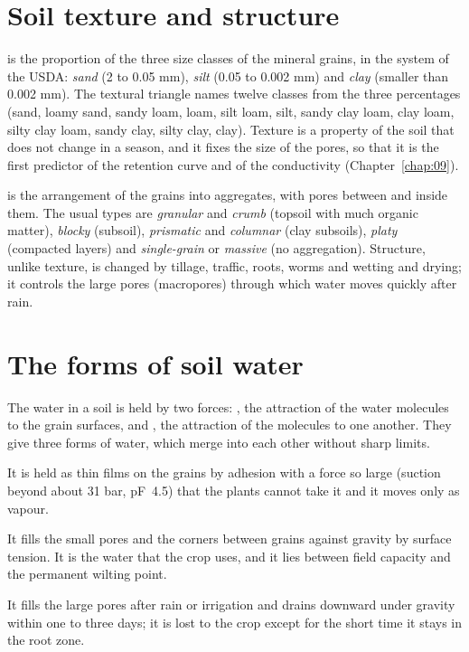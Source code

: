 \section{Soil texture and structure}
 is the proportion of the three size classes of the mineral grains, in the system of the USDA: \emph{sand} (2 to 0.05 mm), \emph{silt} (0.05 to 0.002 mm) and \emph{clay} (smaller than 0.002 mm). The textural triangle names twelve classes from the three percentages (sand, loamy sand, sandy loam, loam, silt loam, silt, sandy clay loam, clay loam, silty clay loam, sandy clay, silty clay, clay). Texture is a property of the soil that does not change in a season, and it fixes the size of the pores, so that it is the first predictor of the retention curve and of the conductivity (Chapter~\ref{chap:09}).

\par\noindent {} is the arrangement of the grains into aggregates, with pores between and inside them. The usual types are \emph{granular} and \emph{crumb} (topsoil with much organic matter), \emph{blocky} (subsoil), \emph{prismatic} and \emph{columnar} (clay subsoils), \emph{platy} (compacted layers) and \emph{single-grain} or \emph{massive} (no aggregation). Structure, unlike texture, is changed by tillage, traffic, roots, worms and wetting and drying; it controls the large pores (macropores) through which water moves quickly after rain.

\section{The forms of soil water}
The water in a soil is held by two forces: , the attraction of the water molecules to the grain surfaces, and , the attraction of the molecules to one another. They give three forms of water, which merge into each other without sharp limits.
\begin{exlist}
\item {} It is held as thin films on the grains by adhesion with a force so large (suction beyond about 31 bar, pF~4.5) that the plants cannot take it and it moves only as vapour.
\item {} It fills the small pores and the corners between grains against gravity by surface tension. It is the water that the crop uses, and it lies between field capacity and the permanent wilting point.
\item {} It fills the large pores after rain or irrigation and drains downward under gravity within one to three days; it is lost to the crop except for the short time it stays in the root zone.
\end{exlist}


